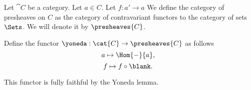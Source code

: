 \begin{definition}
Let $\cat{C}$ be a category.
Let $a\in C$.
Let $f: a' \rightarrow a$
We define the category of presheaves on $C$ as the category of contravariant functors to the category of sets $\Sets$.
We will denote it by $\presheaves{C}$.

Define the functor $\yoneda: \cat{C} \rightarrow  \presheaves{C}$ as follows 
\[a \mapsto \Hom{-}{a},\]
\[f \mapsto f \circ \blank.\]

This functor is fully faithful by the Yoneda lemma.
\end{definition}